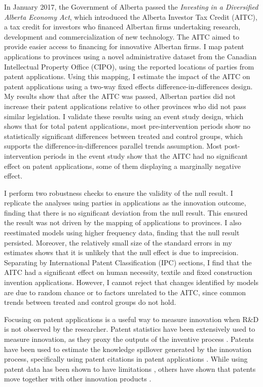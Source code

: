 \documentclass[../main.tex]{subfiles}
\begin{document}
In January 2017, the Government of Alberta passed the \textit{Investing in a Diversified Alberta Economy Act}, which introduced the Alberta Investor Tax Credit (AITC), a tax credit for investors who financed Albertan firms undertaking research, development and commercialization of new technology. The AITC aimed to provide easier access to financing for innovative Albertan firms. I map patent applications to provinces using a novel administrative dataset from the Canadian Intellectual Property Office (CIPO), using the reported locations of parties from patent applications. Using this mapping, I estimate the impact of the AITC on patent applications using a two-way fixed effects difference-in-differences design. My results show that after the AITC was passed, Albertan parties did not increase their patent applications relative to other provinces who did not pass similar legislation. I validate these results using an event study design, which shows that for total patent applications, most pre-intervention periods show no statistically significant differences between treated and control groups, which supports the difference-in-differences parallel trends assumption. Most post-intervention periods in the event study show that the AITC had no significant effect on patent applications, some of them displaying a marginally negative effect.

I perform two robustness checks to ensure the validity of the null result. I replicate the analyses using parties in applications as the innovation outcome, finding that there is no significant deviation from the null result. This ensured the result was not driven by the mapping of applications to provinces. I also reestimated models using higher frequency data, finding that the null result persisted. Moreover, the relatively small size of the standard errors in my estimates shows that it is unlikely that the null effect is due to imprecision. Separating by International Patent Classification (IPC) sections, I find that the AITC had a significant effect on human necessity, textile and fixed construction invention applications. However, I cannot reject that changes identified by models are due to random chance or to factors unrelated to the AITC, since common trends between treated and control groups do not hold. 

Focusing on patent applications is a useful way to measure innovation when R\&D is not observed by the researcher. Patent statistics have been extensively used to measure innovation, as they proxy the outputs of the inventive process \parencite{nordhaus69, pavitt85,trajtenberg90,artz_etal10}. Patents have been used to estimate the knowledge spillover generated by the innovation process, specifically using patent citations in patent applications \parencite{trajtenberg90,jaffe_etal93}. While using patent data has been shown to have limitations \parencite{lanjouw_etal98a}, others have shown that patents move together with other innovation products \parencite{lanjouw_schankerman04}.
\end{document}
